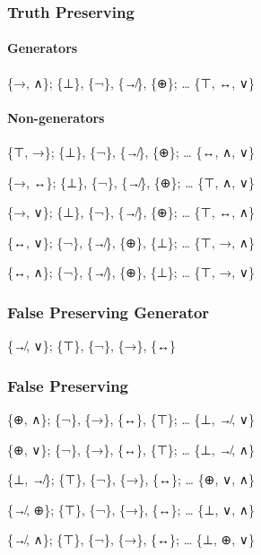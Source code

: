 \hypertarget{truth-preserving}{%
\subsubsection{Truth Preserving}\label{truth-preserving}}

\hypertarget{generators}{%
\paragraph{Generators}\label{generators}}

\{→, ∧\}; \{⊥\}, \{¬\}, \{↛\}, \{⊕\}; \ldots{} \{⊤, ↔, ∨\}

\hypertarget{non-generators}{%
\paragraph{Non-generators}\label{non-generators}}

\{⊤, →\}; \{⊥\}, \{¬\}, \{↛\}, \{⊕\}; \ldots{} \{↔, ∧, ∨\}

\{→, ↔\}; \{⊥\}, \{¬\}, \{↛\}, \{⊕\}; \ldots{} \{⊤, ∧, ∨\}

\{→, ∨\}; \{⊥\}, \{¬\}, \{↛\}, \{⊕\}; \ldots{} \{⊤, ↔, ∧\}

\{↔, ∨\}; \{¬\}, \{↛\}, \{⊕\}, \{⊥\}; \ldots{} \{⊤, →, ∧\}

\{↔, ∧\}; \{¬\}, \{↛\}, \{⊕\}, \{⊥\}; \ldots{} \{⊤, →, ∨\}

\hypertarget{false-preserving-generator}{%
\subsubsection{False Preserving
Generator}\label{false-preserving-generator}}

\{↛, ∨\}; \{⊤\}, \{¬\}, \{→\}, \{↔\}

\hypertarget{false-preserving}{%
\subsubsection{False Preserving}\label{false-preserving}}

\{⊕, ∧\}; \{¬\}, \{→\}, \{↔\}, \{⊤\}; \ldots{} \{⊥, ↛, ∨\}

\{⊕, ∨\}; \{¬\}, \{→\}, \{↔\}, \{⊤\}; \ldots{} \{⊥, ↛, ∧\}

\{⊥, ↛\}; \{⊤\}, \{¬\}, \{→\}, \{↔\}; \ldots{} \{⊕, ∨, ∧\}

\{↛, ⊕\}; \{⊤\}, \{¬\}, \{→\}, \{↔\}; \ldots{} \{⊥, ∨, ∧\}

\{↛, ∧\}; \{⊤\}, \{¬\}, \{→\}, \{↔\}; \ldots{} \{⊥, ⊕, ∨\}

